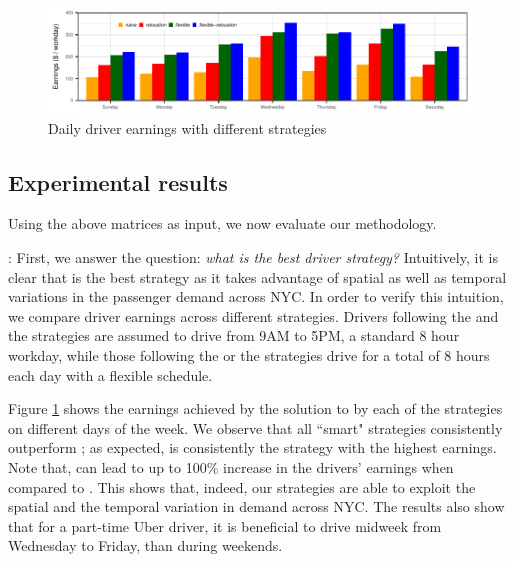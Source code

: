 \fi

\begin{figure}
	\centering
	\includegraphics{figures/daily_earnings.pdf}
	\caption{Daily driver earnings with different strategies}
	\label{fig:daily_earnings}
\end{figure}
\subsection{Experimental results}
Using the above matrices as input, we now evaluate our methodology.

: First, we answer the question: \textit{what is the best driver strategy?} Intuitively, it is clear that {\relocationflexible} is the best strategy as it takes advantage of spatial as well as temporal variations in the passenger demand across NYC. In order to verify this intuition, we compare driver earnings across different strategies. Drivers following the {\naive} and the {\relocation} strategies are assumed to drive from 9AM to 5PM, a standard 8 hour workday, while those following the {\flexible} or the {\relocationflexible} strategies drive for a total of 8 hours each day with a flexible schedule.

Figure \ref{fig:daily_earnings} shows the earnings achieved by 
the solution to {\originalproblem} by each of the strategies on different days of the week. We observe that all ``smart" strategies consistently outperform {\naive};
as expected, {\relocationflexible} is consistently the strategy with the highest earnings.
Note that, {\relocationflexible} can lead to up to 100\% increase in the drivers'
earnings when compared to {\naive}.  
This shows that, indeed, our strategies are able to exploit the spatial and the temporal variation in demand across NYC. The results also show
that for a part-time Uber driver, it is beneficial to drive midweek from Wednesday to Friday, than during weekends.


